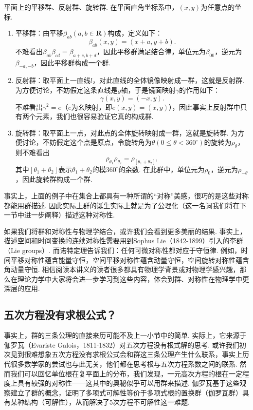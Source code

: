 \begin{example*}
    平面上的平移群、反射群、旋转群. 在平面直角坐标系中，$(x,y)$为任意点的坐标.
    \begin{enumerate}
        \item 平移群：由平移$\beta_{ab}(a,b\in\mathbf{R})$构成，定义如下：
        \[\beta_{ab}(x,y)=(x+a,y+b).\]
        不难看出$\beta_{ab}\beta_{cd}=\beta_{a+c,b+d}$，因此平移群满足结合律，单位元为$\beta_{00}$，逆元为$\beta_{-a,-b}$，因此平移群构成一个群.

        \item 反射群：取平面上一直线$l$，对此直线的全体镜像映射成一群，这就是反射群. 为方便讨论，不妨假定这条直线是$y$轴，于是镜面映射$\gamma$的作用如下：
        \[\gamma(x,y)=(-x,y).\]
        不难看出$\gamma^2=e$（$e$为幺映射，即$e(x,y)=(x,y)$），因此事实上反射群中只有两个元素，我们也很容易验证它真的构成群.

        \item 旋转群：取平面上一点，对此点的全体旋转映射成一群，这就是旋转群. 为方便讨论，不妨假定这个点是原点，令旋转角为$\theta(0\leqslant\theta<360^\circ)$的旋转为$\rho_\theta$，则不难看出
        \[\rho_{\theta_1}\rho_{\theta_2}=\rho_{[\theta_1+\theta_2]},\]
        其中$[\theta_1+\theta_2]$表示$\theta_1+\theta_2$的模$360^\circ$的余数. 在此群中，单位元为$\rho_0$，逆元为$\rho_{-\theta}$，因此旋转群构成一个群.
    \end{enumerate}
\end{example*}

事实上，上面的例子中在集合上都具有一种所谓的``对称''美感，很巧的是这些对称都能用群描述. 因此实际上群的诞生实际上就是为了公理化（这一名词我们将在下一节中进一步阐释）描述这种对称性.

如果我们将群和对称性与物理学结合，或许我们会看到更多美丽的结果. 事实上，描述空间和时间变换的连续对称性需要用到Sophus Lie（1842-1899）引入的李群（Lie groups）. 而诺特定理告诉我们：任何可微对称性都对应于守恒律. 例如，时间平移对称性蕴含能量守恒，空间平移对称性蕴含动量守恒，空间旋转对称性蕴含角动量守恒. 相信阅读本讲义的读者很多都具有物理学背景或对物理学感兴趣，那么在理论力学中大家将会进一步学习到这些内容，体会到群、对称性在物理学中更深层的应用.

\subsection*{五次方程没有求根公式？}
事实上，群的三条公理的直接来历可能不及上一小节中的简单. 实际上，它来源于伽罗瓦（Evariste Galois，1811-1832）对五次方程没有根式解的思考. 或许我们初次见到很难想象五次方程没有求根公式会和群这三条公理产生什么联系，事实上历代很多数学家的尝试也与此无关，他们都在思考根与五次方程系数之间的联系. 然而我们可以回忆单位根在复平面上的分布，我们发现，一元高次方程的根在一定程度上具有较强的对称性——这其中的奥秘似乎可以用群来描述. 伽罗瓦基于这些观察建立了群的概念，证明了多项式可解性等价于多项式根的置换群（伽罗瓦群）具有某种结构（可解性），从而解决了5次方程不可解性这一难题.

